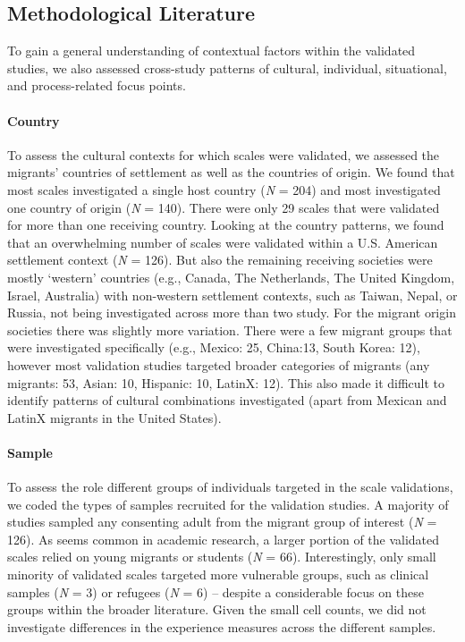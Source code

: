 \subsection{Methodological Literature}

To gain a general understanding of contextual factors within the
validated studies, we also assessed cross-study patterns of cultural,
individual, situational, and process-related focus points.

\paragraph{Country}

To assess the cultural contexts for which scales were validated, we
assessed the migrants' countries of settlement as well as the countries
of origin. We found that most scales investigated a single host country
(\textit{N} = 204) and most investigated one country of origin
(\textit{N} = 140). There were only 29 scales that were validated for
more than one receiving country. Looking at the country patterns, we
found that an overwhelming number of scales were validated within a U.S.
American settlement context (\textit{N} = 126). But also the remaining
receiving societies were mostly `western' countries (e.g., Canada, The
Netherlands, The United Kingdom, Israel, Australia) with non-western
settlement contexts, such as Taiwan, Nepal, or Russia, not being
investigated across more than two study. For the migrant origin
societies there was slightly more variation. There were a few migrant
groups that were investigated specifically (e.g., Mexico: 25, China:13,
South Korea: 12), however most validation studies targeted broader
categories of migrants (any migrants: 53, Asian: 10, Hispanic: 10,
LatinX: 12). This also made it difficult to identify patterns of
cultural combinations investigated (apart from Mexican and LatinX
migrants in the United States).

\paragraph{Sample}

To assess the role different groups of individuals targeted in the scale
validations, we coded the types of samples recruited for the validation
studies. A majority of studies sampled any consenting adult from the
migrant group of interest (\textit{N} = 126). As seems common in
academic research, a larger portion of the validated scales relied on
young migrants or students (\textit{N} = 66). Interestingly, only small
minority of validated scales targeted more vulnerable groups, such as
clinical samples (\textit{N} = 3) or refugees (\textit{N} = 6) --
despite a considerable focus on these groups within the broader
literature. Given the small cell counts, we did not investigate
differences in the experience measures across the different samples.

